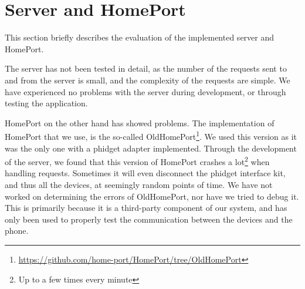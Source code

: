 \section{Server and HomePort}\label{sec:servereval}
This section briefly describes the evaluation of the implemented server and HomePort. 

The server has not been tested in detail, 
as the number of the requests sent to and from the server is small,
and the complexity of the requests are simple. 
We have experienced no problems with the server during development,
or through testing the application. 

HomePort on the other hand has showed problems. 
The implementation of HomePort that we use, 
is the so-called OldHomePort\footnote{\url{https://github.com/home-port/HomePort/tree/OldHomePort}}. 
We used this version as it was the only one with a phidget adapter implemented. 
Through the development of the server, 
we found that this version of HomePort crashes a lot\footnote{Up to a few times every minute} when handling requests. 
Sometimes it will even disconnect the phidget interface kit, 
and thus all the devices, at seemingly random points of time. 
We have not worked on determining the errors of OldHomePort, 
nor have we tried to debug it. 
This is primarily because it is a third-party component of our system, 
and has only been used to properly test the communication between the devices and the phone. 